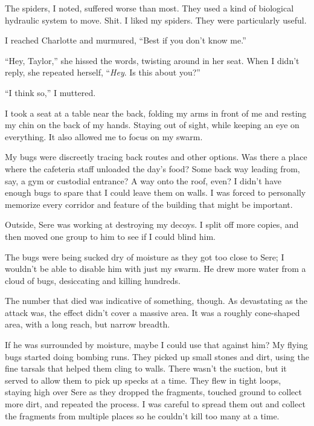 The spiders, I noted, suffered worse than most.  They used a kind of biological hydraulic system to move.  Shit.  I liked my spiders.  They were particularly useful.



I reached Charlotte and murmured, ``Best if you don't know me.''



``Hey, Taylor,'' she hissed the words, twisting around in her seat.  When I didn't reply, she repeated herself, ``\emph{Hey}.  Is this about you?''



``I think so,'' I muttered.



I took a seat at a table near the back, folding my arms in front of me and resting my chin on the back of my hands.  Staying out of sight, while keeping an eye on everything.  It also allowed me to focus on my swarm.



My bugs were discreetly tracing back routes and other options.  Was there a place where the cafeteria staff unloaded the day's food?  Some back way leading from, say, a gym or custodial entrance?  A way onto the roof, even?  I didn't have enough bugs to spare that I could leave them on walls.  I was forced to personally memorize every corridor and feature of the building that might be important.



Outside, Sere was working at destroying my decoys.  I split off more copies, and then moved one group to him to see if I could blind him.



The bugs were being sucked dry of moisture as they got too close to Sere; I wouldn't be able to disable him with just my swarm.  He drew more water from a cloud of bugs, desiccating and killing hundreds.



The number that died was indicative of something, though.  As devastating as the attack was, the effect didn't cover a massive area.  It was a roughly cone-shaped area, with a long reach, but narrow breadth.



If he was surrounded by moisture, maybe I could use that against him?  My flying bugs started doing bombing runs.  They picked up small stones and dirt, using the fine tarsals that helped them cling to walls.  There wasn't the suction, but it served to allow them to pick up specks at a time.  They flew in tight loops, staying high over Sere as they dropped the fragments, touched ground to collect more dirt, and repeated the process.  I was careful to spread them out and collect the fragments from multiple places so he couldn't kill too many at a time.



